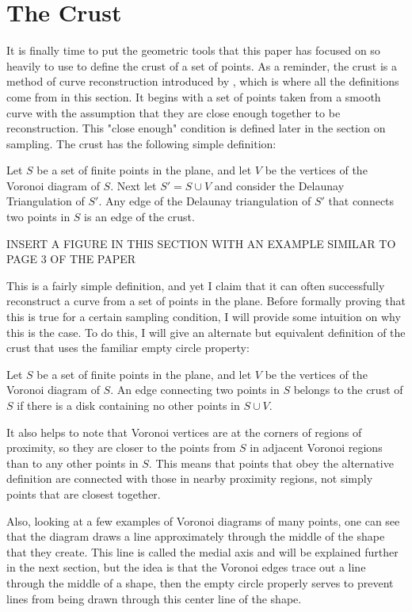 \section{The Crust}
It is finally time to put the geometric tools that this paper has focused on so heavily to use to define the crust of a set of points. As a reminder, the crust is a method of curve reconstruction introduced by \cite{crust}, which is where all the definitions come from in this section. It begins with a set of points taken from a smooth curve with the assumption that they are close enough together to be reconstruction. This "close enough" condition is defined later in the section on sampling. The crust has the following simple definition:

\begin{definition}
	Let $S$ be a set of finite points in the plane, and let $V$ be the vertices of the Voronoi diagram of $S$. Next let $S'=S \cup V$ and consider the Delaunay Triangulation of $S'$. Any edge of the Delaunay triangulation of $S'$ that connects two points in $S$ is an edge of the crust.
\end{definition}

INSERT A FIGURE IN THIS SECTION WITH AN EXAMPLE SIMILAR TO PAGE 3 OF THE PAPER

This is a fairly simple definition, and yet I claim that it can often successfully reconstruct a curve from a set of points in the plane. Before formally proving that this is true for a certain sampling condition, I will provide some intuition on why this is the case. To do this, I will give an alternate but equivalent definition of the crust that uses the familiar empty circle property:

\begin{definition}
	Let $S$ be a set of finite points in the plane, and let $V$ be the vertices of the Voronoi diagram of $S$. An edge connecting two points in $S$ belongs to the crust of $S$ if there is a disk containing no other points in $S \cup V$.
\end{definition}

It also helps to note that Voronoi vertices are at the corners of regions of proximity, so they are closer to the points from $S$ in adjacent Voronoi regions than to any other points in $S$. This means that points that obey the alternative definition are connected with those in nearby proximity regions, not simply points that are closest together.

Also, looking at a few examples of Voronoi diagrams of many points, one can see that the diagram draws a line approximately through the middle of the shape that they create. This line is called the medial axis and will be explained further in the next section, but the idea is that the Voronoi edges trace out a line through the middle of a shape, then the empty circle properly serves to prevent lines from being drawn through this center line of the shape.

